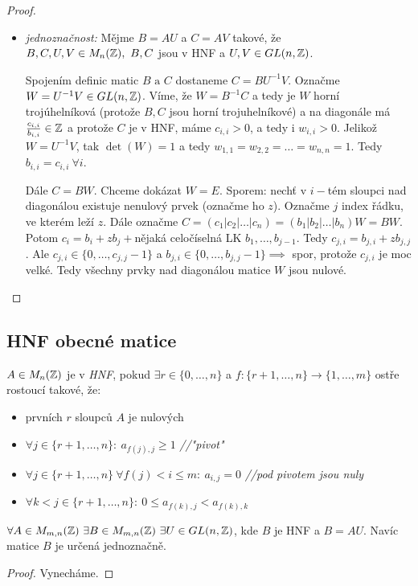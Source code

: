 \begin{proof}
\begin{itemize}[label={}]
    \item \emph{jednoznačnost:}
    Mějme $B = AU$ a $C = AV$ takové, že $B,C,U,V \in M_n(\operatorname{\mathbb{Z}}),\ B,C$ jsou v HNF a $U,V \in GL(n, \operatorname{\mathbb{Z}})$.

    Spojením definic matic $B \text{ a } C$ dostaneme $C = BU^{-1}V$. Označme $W = U^{-1}V \in GL(n,\operatorname{\mathbb{Z}})$. Víme, že $W = B^{-1}C$ a tedy je $W$ horní trojúhelníková (protože $B,C$ jsou horní trojuhelníkové) a na diagonále má $\frac{c_{i,i}}{b_{i,i}} \in \operatorname{\mathbb{Z}}$ a protože $C$ je v HNF, máme $c_{i,i} > 0$, a tedy i $w_{i,i} > 0$.
    Jelikož $W = U^{-1}V$, tak $\det(W) = 1$ a tedy $w_{1,1} = w_{2,2} = \dots = w_{n,n} = 1$. Tedy $b_{i,i} = c_{i,i} \ \forall i$.

    Dále $C = BW$. Chceme dokázat $W = E$. Sporem:
    nechť v $i-$tém sloupci nad diagonálou existuje nenulový prvek (označme ho $z$). Označme $j$ index řádku, ve kterém leží $z$. Dále označme $C = (c_1 | c_2 | \dots | c_n) = (b_1 | b_2 | \dots | b_n)W = BW$. Potom $c_i = b_i + zb_j + $nějaká celočíselná LK $b_1, \dots , b_{j-1}$. 
    Tedy $c_{j,i} = b_{j,i} + zb_{j,j}$. Ale $c_{j,i} \in \{0, \dots, c_{j,j}-1\}$ a $b_{j,i} \in \{0, \dots, b_{j,j}-1\} \implies$ spor, protože $c_{j,i}$ je moc velké. Tedy všechny prvky nad diagonálou matice $W$ jsou nulové.
\end{itemize}
\end{proof}

\subsection{HNF obecné matice}
\begin{definition}
    $A \in M_n(\operatorname{\mathbb{Z}})$ je v \emph{HNF}, pokud $\exists r \in \{0, \dots, n\}$ a $f: \{r+1, \dots, n\} \rightarrow \{1, \dots, m\}$ ostře rostoucí takové, že:
    \begin{itemize}
        \item prvních $r$ sloupců $A$ je nulových
        \item $\forall j \in \{r+1, \dots, n\}: \ a_{f(j),j} \geq 1$ \textit{//"pivot"}
        \item $\forall j \in \{r+1, \dots, n\} \ \forall f(j) < i \leq m: \ a_{i,j} = 0$ \textit{//pod pivotem jsou nuly}
        \item $\forall k < j \in \{r+1, \dots, n\}: \ 0 \leq a_{f(k),j} < a_{f(k), k}$
    \end{itemize} 
\end{definition}

\begin{theorem}\label{theorem3_19}
    $\forall A \in M_{m,n}(\operatorname{\mathbb{Z}}) \ \exists B \in M_{m,n}(\operatorname{\mathbb{Z}}) \ \exists U \in GL(n,\operatorname{\mathbb{Z}})$, kde $B$ je HNF a $B = AU$. Navíc matice $B$ je určená jednoznačně.
\end{theorem}
\begin{proof}
    Vynecháme.
\end{proof}

